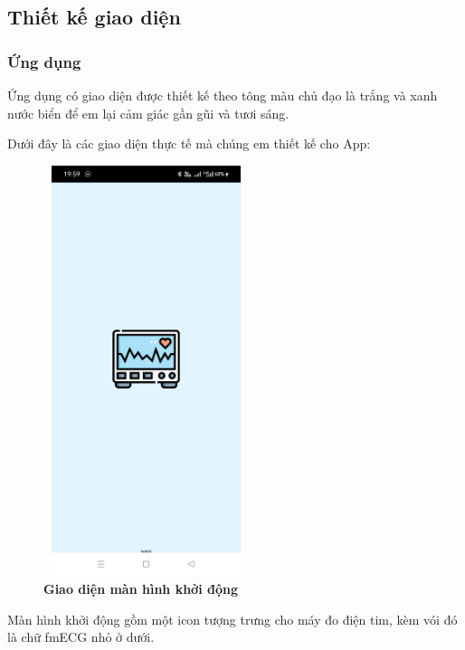 \subsection{Thiết kế giao diện}

\subsubsection{Ứng dụng}

Ứng dụng có giao diện được thiết kế theo tông màu chủ đạo là trắng và xanh nước biển để em lại cảm giác gần gũi và tươi sáng.

Dưới đây là các giao diện thực tế mà chúng em thiết kế cho App:

\begin{figure}[H]
  \centering
  \includegraphics[width=6cm,height=12cm]{Images/mobile_app/demo/splash_screen_demo.jpg}
  \caption[Giao diện màn hình khởi động]{\bfseries \fontsize{12pt}{0pt}\selectfont Giao diện màn hình khởi động}
  \label{demo_splash_screen} %
\end{figure}

Màn hình khởi động gồm một icon tượng trưng cho máy đo điện tim, kèm vói đó là chữ fmECG nhỏ ở dưới.  

